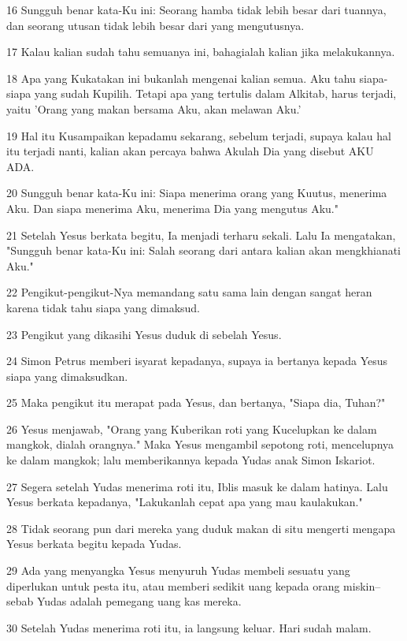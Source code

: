 \par 16 Sungguh benar kata-Ku ini: Seorang hamba tidak lebih besar dari tuannya, dan seorang utusan tidak lebih besar dari yang mengutusnya.
\par 17 Kalau kalian sudah tahu semuanya ini, bahagialah kalian jika melakukannya.
\par 18 Apa yang Kukatakan ini bukanlah mengenai kalian semua. Aku tahu siapa-siapa yang sudah Kupilih. Tetapi apa yang tertulis dalam Alkitab, harus terjadi, yaitu 'Orang yang makan bersama Aku, akan melawan Aku.'
\par 19 Hal itu Kusampaikan kepadamu sekarang, sebelum terjadi, supaya kalau hal itu terjadi nanti, kalian akan percaya bahwa Akulah Dia yang disebut AKU ADA.
\par 20 Sungguh benar kata-Ku ini: Siapa menerima orang yang Kuutus, menerima Aku. Dan siapa menerima Aku, menerima Dia yang mengutus Aku."
\par 21 Setelah Yesus berkata begitu, Ia menjadi terharu sekali. Lalu Ia mengatakan, "Sungguh benar kata-Ku ini: Salah seorang dari antara kalian akan mengkhianati Aku."
\par 22 Pengikut-pengikut-Nya memandang satu sama lain dengan sangat heran karena tidak tahu siapa yang dimaksud.
\par 23 Pengikut yang dikasihi Yesus duduk di sebelah Yesus.
\par 24 Simon Petrus memberi isyarat kepadanya, supaya ia bertanya kepada Yesus siapa yang dimaksudkan.
\par 25 Maka pengikut itu merapat pada Yesus, dan bertanya, "Siapa dia, Tuhan?"
\par 26 Yesus menjawab, "Orang yang Kuberikan roti yang Kucelupkan ke dalam mangkok, dialah orangnya." Maka Yesus mengambil sepotong roti, mencelupnya ke dalam mangkok; lalu memberikannya kepada Yudas anak Simon Iskariot.
\par 27 Segera setelah Yudas menerima roti itu, Iblis masuk ke dalam hatinya. Lalu Yesus berkata kepadanya, "Lakukanlah cepat apa yang mau kaulakukan."
\par 28 Tidak seorang pun dari mereka yang duduk makan di situ mengerti mengapa Yesus berkata begitu kepada Yudas.
\par 29 Ada yang menyangka Yesus menyuruh Yudas membeli sesuatu yang diperlukan untuk pesta itu, atau memberi sedikit uang kepada orang miskin--sebab Yudas adalah pemegang uang kas mereka.
\par 30 Setelah Yudas menerima roti itu, ia langsung keluar. Hari sudah malam.

